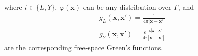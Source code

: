 %
where $i \in \{L,Y\}$, $\varphi(\mathbf{x})$ can be any distribution over $\Gamma$, and %
\begin{align}\label{eq:green_func}
g_L(\mathbf{x},\mathbf{x}')=\frac{1}{4\pi|\mathbf{x}-\mathbf{x}'|} \nonumber \\
g_Y(\mathbf{x},\mathbf{x}')=\frac{e^{-\kappa|\mathbf{x}-\mathbf{x}'|}}{4\pi|\mathbf{x}-\mathbf{x}'|}
\end{align}
are the corresponding free-space Green's functions.

